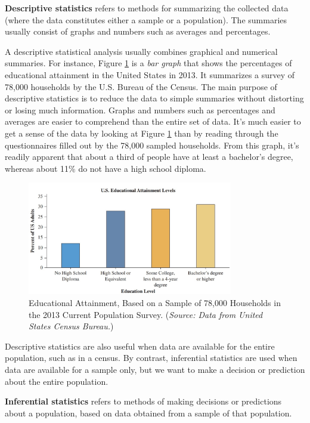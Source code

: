 \textbf{Descriptive statistics} refers to methods for summarizing the collected data (where the data constitutes either a sample or a population). The summaries usually consist of graphs and numbers such as averages and percentages.

A descriptive statistical analysis usually combines graphical and numerical summaries. For instance, Figure \ref{fig:education_levels.jpg} is a \textit{bar graph} that shows the percentages of educational attainment in the United States in 2013. It summarizes a survey of 78,000 households by the U.S. Bureau of the Census. The main purpose of descriptive statistics is to reduce the data to simple summaries without distorting or losing much information. Graphs and numbers such as percentages and averages are easier to comprehend than the entire set of data. It’s much easier to get a sense of the data by looking at Figure \ref{fig:education_levels.jpg} than by reading through the questionnaires filled out by the 78,000 sampled households. From this graph, it’s readily apparent that about a third of people have at least a bachelor’s degree, whereas about 11\% do not have a high school diploma.

\begin{figure}[h!]
\centering
\includegraphics[width=0.8\textwidth]{figures/education_levels.jpg}
\caption{Educational Attainment, Based on a Sample of 78,000 Households in the 2013 Current Population Survey. (\textit{Source: Data from United States Census Bureau.})}
\label{fig:education_levels.jpg}
\end{figure}

Descriptive statistics are also useful when data are available for the entire population, such as in a census. By contrast, inferential statistics are used when data are available for a sample only, but we want to make a decision or prediction about the entire population.

\textbf{Inferential statistics} refers to methods of making decisions or predictions about a population, based on data obtained from a sample of that population.

